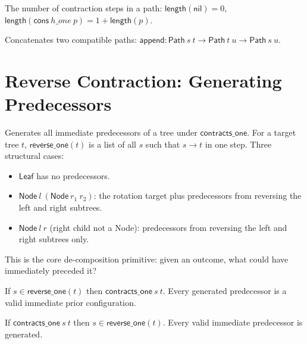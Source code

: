 \begin{definition}
\label{def:path_length}
\leanok
{}
The number of contraction steps in a path:
$\mathsf{length}(\mathsf{nil}) = 0$,
$\mathsf{length}(\mathsf{cons}\ h\_one\ p) = 1 + \mathsf{length}(p)$.
\end{definition}

\begin{definition}
\label{def:path_append}
\leanok
{}
Concatenates two compatible paths: $\mathsf{append} : \mathsf{Path}\ s\ t \to \mathsf{Path}\ t\ u \to \mathsf{Path}\ s\ u$.
\end{definition}

\section{Reverse Contraction: Generating Predecessors}

\begin{definition}
\label{def:reverse_one}
\leanok
{}
Generates all immediate predecessors of a tree under $\mathsf{contracts\_one}$.
For a target tree $t$, $\mathsf{reverse\_one}(t)$ is a list of all $s$ such that
$s \to t$ in one step. Three structural cases:
\begin{itemize}
  \item $\mathsf{Leaf}$ has no predecessors.
  \item $\mathsf{Node}\ l\ (\mathsf{Node}\ r_1\ r_2)$: the rotation target plus
    predecessors from reversing the left and right subtrees.
  \item $\mathsf{Node}\ l\ r$ (right child not a Node): predecessors from
    reversing the left and right subtrees only.
\end{itemize}
This is the core de-composition primitive: given an outcome, what could have
immediately preceded it?
\end{definition}

\begin{theorem}
\label{thm:reverse_one_sound}
\leanok
{}
If $s \in \mathsf{reverse\_one}(t)$ then $\mathsf{contracts\_one}\ s\ t$.
Every generated predecessor is a valid immediate prior configuration.
\end{theorem}

\begin{theorem}
\label{thm:reverse_one_complete}
\leanok
{}
If $\mathsf{contracts\_one}\ s\ t$ then $s \in \mathsf{reverse\_one}(t)$.
Every valid immediate predecessor is generated.
\end{theorem}

